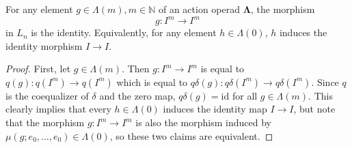 \documentclass{amsbook} %
\newcommand{\id}{\textrm{id}}
\newcommand{\ML}{\mathbf{\Lambda}}
\newcommand{\ELnn}{E\Lambda(\underline{2n})}
\newenvironment{eq*}{\begin{equation*}}{\end{equation*}}
\numberwithin{section}{chapter}
\begin{document}
\begin{lem} \label{noscalar} For any element $g \in \Lambda(m), m \in \mathbb{N}$ of an action operad $\ML$, the morphism
\[
g: I^m \to I^m
\]
in $L_n$ is the identity.
Equivalently, for any element $h \in \Lambda(0)$, $h$ induces the identity morphism $I \to I$.
\end{lem}
\begin{proof}
First, let $g \in \Lambda(m)$. Then $g: I^m \to I^m$ is equal to $q(g):q(I^m) \to q(I^m)$ which is equal to $q\delta(g): q\delta(I^m) \to q\delta(I^m)$. Since $q$ is the coequalizer of $\delta$ and the zero map, $q\delta(g) = \id$ for all $g \in \Lambda(m)$. This clearly implies that every $h \in \Lambda(0)$ induces the identity map $I \to I$, but note that the morphism $g:I^m \to I^m$ is also the morphism induced by $\mu(g; e_0, \ldots, e_0) \in \Lambda(0)$, so these two claims are equivalent.


%
\end{proof}
\end{document}
